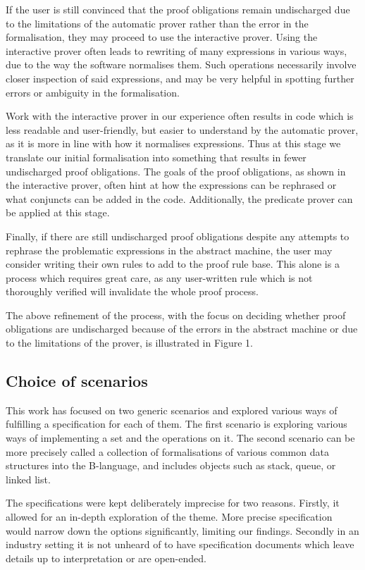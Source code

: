 \documentclass[11pt,journal]{IEEEtran}
\begin{document}
	If the user is still convinced that the proof obligations remain undischarged due to the limitations of the automatic prover rather than the error in the formalisation, they may proceed to use the interactive prover. Using the interactive prover often leads to rewriting of many expressions in various ways, due to the way the software normalises them. Such operations necessarily involve closer inspection of said expressions, and may be very helpful in spotting further errors or ambiguity in the formalisation.
	
	Work with the interactive prover in our experience often results in code which is less readable and user-friendly, but easier to understand by the automatic prover, as it is more in line with how it normalises expressions. Thus at this stage we translate our initial formalisation into something that results in fewer undischarged proof obligations. The goals of the proof obligations, as shown in the interactive prover, often hint at how the expressions can be rephrased or what conjuncts can be added in the code. Additionally, the predicate prover can be applied at this stage.
	
	Finally, if there are still undischarged proof obligations despite any attempts to rephrase the problematic expressions in the abstract machine, the user may consider writing their own rules to add to the proof rule base. This alone is a process which requires great care, as any user-written rule which is not thoroughly verified will invalidate the whole proof process. 
	
	The above refinement of the process, with the focus on deciding whether proof obligations are undischarged because of the errors in the abstract machine or due to the limitations of the prover, is illustrated in Figure 1.


	\subsection{Choice of scenarios}
	This work has focused on two generic scenarios and explored various ways of fulfilling a specification for each of them. The first scenario is exploring various ways of implementing a set and the operations on it. The second scenario can be more precisely called a collection of formalisations of various common data structures into the B-language, and includes objects such as stack, queue, or linked list.
	
	The specifications were kept deliberately imprecise for two reasons. Firstly, it allowed for an in-depth exploration of the theme. More precise specification would narrow down the options significantly, limiting our findings. Secondly in an industry setting it is not unheard of to have specification documents which leave details up to interpretation or are open-ended. 
	
\end{document}
